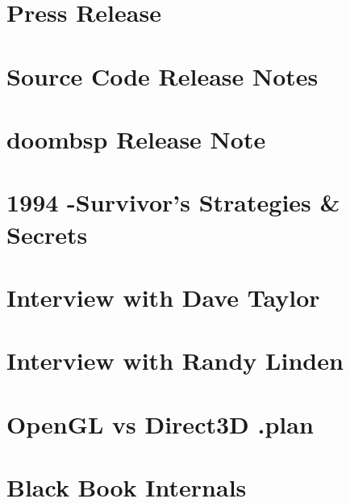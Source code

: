 \documentclass{book}
\begin{document}
      \chapter{Press Release}
      
      \chapter{Source Code Release Notes}
      
      \chapter{doombsp Release Note}
      
      \chapter{1994 -Survivor's Strategies \& Secrets}
      
   
      \chapter{Interview with Dave Taylor}
      
      \chapter{Interview with Randy Linden}
            
      \chapter{OpenGL vs Direct3D .plan}
      
        \chapter{Black Book Internals}
    
    \cleartoleftpage %
    
    \blankpage
    \blankpage
\end{document}
